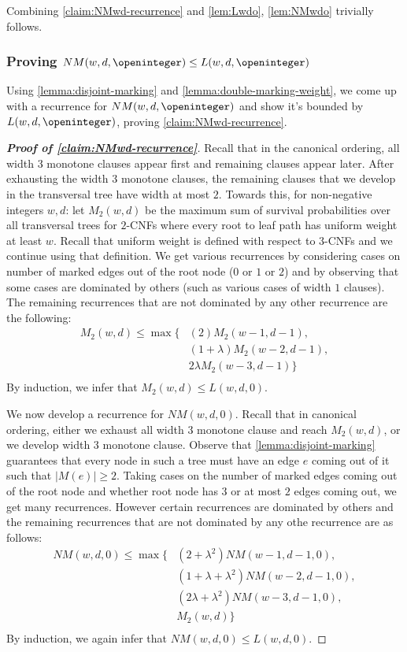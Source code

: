 Combining \cref{claim:NMwd-recurrence} and \cref{lem:Lwdo}, \cref{lem:NMwdo} trivially follows.


\subsubsection{Proving $NM(w, d, \openinteger)\le L(w, d, \openinteger)$}


Using \cref{lemma:disjoint-marking} and \cref{lemma:double-marking-weight}, we come up with a recurrence for $NM(w, d, \openinteger)$ and show it's bounded by $L(w, d, \openinteger)$, proving \cref{claim:NMwd-recurrence}.

\begin{proof}[\textbf{Proof of \cref{claim:NMwd-recurrence}}]
Recall that in the canonical ordering, all width $3$ monotone clauses appear first and remaining clauses appear later. After exhausting the width $3$ monotone clauses, the remaining clauses that we develop in the transversal tree have width at most $2$. Towards this, for non-negative integers $w, d$: let $M_2(w, d)$ be the maximum sum of survival probabilities over all transversal trees for $2$-CNFs where every root to leaf path has uniform weight at least $w$. Recall that uniform weight is defined with respect to $3$-CNFs and we continue using that definition.
We get various recurrences by considering cases on number of marked edges out of the root node ($0$ or $1$ or $2$) and by observing that some cases are dominated by others (such as various cases of width $1$ clauses).
The remaining recurrences that are not dominated by any other recurrence are the following:
\begin{align*}
M_2(w, d) \le 
\max\{
& (2)M_2(w-1, d-1),\\
& (1+\lambda)M_2(w-2, d-1),\\
& 2\lambda M_2(w-3, d-1)
\}\\
\end{align*}
By induction, we infer that $M_2(w, d) \le L(w, d, 0)$.

We now develop a recurrence for $NM(w, d, 0)$.
Recall that in canonical ordering, either we exhaust all width $3$ monotone clause and reach $M_2(w, d)$, or we develop width $3$ monotone clause.
Observe that \cref{lemma:disjoint-marking} guarantees that every node in such a tree must have an edge $e$ coming out of it such that $|M(e)| \ge 2$. Taking cases on the number of marked edges coming out of the root node and whether root node has $3$ or at most $2$ edges coming out, we get many recurrences.
However certain recurrences are dominated by others and the remaining recurrences that are not dominated by any othe recurrence are as follows:
\begin{align*}
NM(w, d, 0) \le 
\max\{
& (2 + \lambda^2)NM(w-1, d-1, 0),\\
& (1+\lambda+\lambda^2)NM(w-2, d-1, 0),\\
& (2\lambda+\lambda^2) NM(w-3, d-1, 0),\\
& M_2(w, d)
\}\\
\end{align*}
By induction, we again infer that $NM(w, d, 0) \le L(w, d, 0)$.


\end{proof}

